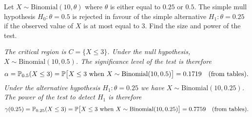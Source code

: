 \begin{exercise}
\begin{questions}
\question
Let $X\sim\text{Binomial}(10,\theta)$ where $\theta$ is either equal to $0.25$ or $0.5$. The simple mull hypothesis $H_0:\theta=0.5$ is rejected in favour of the simple alternative $H_1:\theta=0.25$ if the observed value of $X$ is at most equal to $3$. Find the size and power of the test.
\begin{answer}
\bit
\it The critical region is $C = \{X\leq 3\}$. Under the null hypothesis, $X\sim\text{Binomial}(10,0.5)$. The significance level of the test is therefore
\[
\alpha = \mathbb{P}_{0.5}(X\leq 3) = \mathbb{P}\big[X\leq 3\text{ when } X\sim\text{Binomial}(10,0.5)\big] = 0.1719 \quad\text{(from tables).}
\]
\it Under the alternative hypothesis $H_1:\theta=0.25$ we have $X\sim\text{Binomial}(10,0.25)$. The power of the test to detect $H_1$ is therefore
\[
\gamma(0.25) = \mathbb{P}_{0.25}(X\leq 3) = \mathbb{P}\big[X\leq 3\text{ when } X\sim\text{Binomial}(10,0.25)\big] = 0.7759 \quad\text{(from tables).}
\]
\eit
\end{answer}


\end{questions}
\end{exercise}
